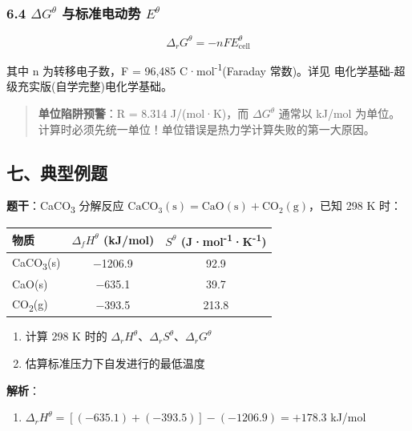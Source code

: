 \subsubsection{\texorpdfstring{6.4 \(\Delta G^\theta\) 与标准电动势 \(E^\theta\)}{6.4 \textbackslash Delta G\^{}\textbackslash theta 与标准电动势 E\^{}\textbackslash theta}}\label{delta-gtheta-ux4e0eux6807ux51c6ux7535ux52a8ux52bf-etheta}

\[
\Delta_r G^\theta = -nFE^\theta_{\text{cell}}
\]

其中 n 为转移电子数，F = 96,485 C·mol\textsuperscript{-1}(Faraday 常数)。详见 电化学基础-超级充实版(自学完整)\textbar 电化学基础。

\begin{quote}
\textbf{单位陷阱预警}：R = 8.314 J/(mol·K)，而 \(\Delta G^\theta\) 通常以 kJ/mol 为单位。计算时必须先统一单位！单位错误是热力学计算失败的第一大原因。
\end{quote}

\subsection{七、典型例题}\label{ux4e03ux5178ux578bux4f8bux9898}

\textbf{题干}：CaCO\textsubscript{3} 分解反应 \(\mathrm{CaCO_3(s) = CaO(s) + CO_2(g)}\)，已知 298 K 时：

{\def\LTcaptype{none} %
\begin{longtable}[]{@{}lcc@{}}
\toprule\noalign{}
物质 & \(\Delta_f H^\theta\) (kJ/mol) & \(S^\theta\) (J·mol\textsuperscript{-1}·K\textsuperscript{-1}) \\
\midrule\noalign{}
\endhead
\bottomrule\noalign{}
\endlastfoot
CaCO\textsubscript{3}(s) & −1206.9 & 92.9 \\
CaO(s) & −635.1 & 39.7 \\
CO\textsubscript{2}(g) & −393.5 & 213.8 \\
\end{longtable}
}

\begin{enumerate}
\def\labelenumi{(\arabic{enumi})}
\tightlist
\item
  计算 298 K 时的 \(\Delta_r H^\theta\)、\(\Delta_r S^\theta\)、\(\Delta_r G^\theta\)
\item
  估算标准压力下自发进行的最低温度
\end{enumerate}

\textbf{解析}：

\begin{enumerate}
\def\labelenumi{(\arabic{enumi})}
\tightlist
\item
  \(\Delta_r H^\theta = [(-635.1) + (-393.5)] - (-1206.9) = +178.3\) kJ/mol
\end{enumerate}

